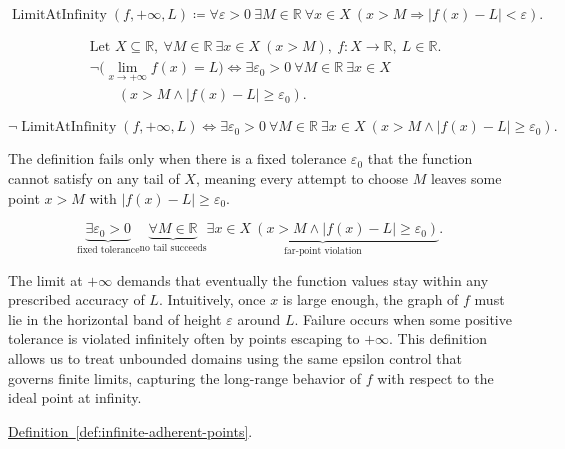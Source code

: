 \begin{remark*}
\[
\operatorname{LimitAtInfinity}(f,+\infty,L) \coloneqq \forall \varepsilon > 0\ \exists M \in \mathbb{R}\ \forall x \in X\ (x > M \Rightarrow |f(x) - L| < \varepsilon).
\]
\end{remark*}

\begin{remark*}
\[
\begin{aligned}
&\text{Let } X \subseteq \mathbb{R},\ \forall M \in \mathbb{R}\ \exists x \in X\ (x > M),\ f : X \to \mathbb{R},\ L \in \mathbb{R}.\\
&\neg\bigl(\lim_{x \to +\infty} f(x) = L\bigr) \Longleftrightarrow \exists \varepsilon_0 > 0\ \forall M \in \mathbb{R}\ \exists x \in X\\
&\qquad (x > M \land |f(x) - L| \ge \varepsilon_0).
\end{aligned}
\]
\end{remark*}

\begin{remark*}
\[
\neg\operatorname{LimitAtInfinity}(f,+\infty,L) \Longleftrightarrow \exists \varepsilon_0 > 0\ \forall M \in \mathbb{R}\ \exists x \in X\ (x > M \land |f(x) - L| \ge \varepsilon_0).
\]
\end{remark*}

\begin{remark*}
The definition fails only when there is a fixed tolerance $\varepsilon_0$ that the function cannot satisfy on any tail of $X$, meaning every attempt to choose $M$ leaves some point $x > M$ with $|f(x) - L| \ge \varepsilon_0$.
\end{remark*}

\begin{remark*}
\[
\underbrace{\exists \varepsilon_0 > 0}_{\text{fixed tolerance}}
\underbrace{\forall M \in \mathbb{R}}_{\text{no tail succeeds}}
\underbrace{\exists x \in X\ (x > M \land |f(x) - L| \ge \varepsilon_0)}_{\text{far-point violation}}.
\]
\end{remark*}

\begin{remark*}[Interpretation]
The limit at $+\infty$ demands that eventually the function values stay within any prescribed accuracy of $L$. Intuitively, once $x$ is large enough, the graph of $f$ must lie in the horizontal band of height $\varepsilon$ around $L$. Failure occurs when some positive tolerance is violated infinitely often by points escaping to $+\infty$. This definition allows us to treat unbounded domains using the same epsilon control that governs finite limits, capturing the long-range behavior of $f$ with respect to the ideal point at infinity.
\end{remark*}

\begin{dependencies}
\hyperref[def:infinite-adherent-points]{Definition~\ref*{def:infinite-adherent-points}}.
\end{dependencies}
